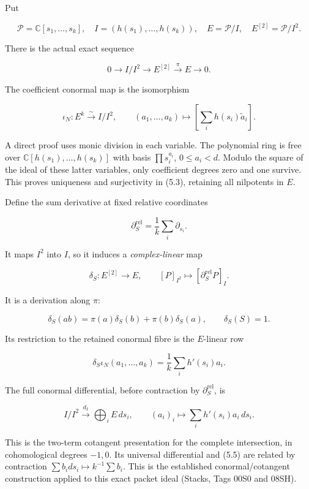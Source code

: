 \documentclass[
]{article}
\begin{document}
Put

\[\mathcal P=\mathbb C[s_1,\ldots,s_k],\quad I=(h(s_1),\ldots,h(s_k)),\quad E=\mathcal P/I,\quad E^{[2]}=\mathcal P/I^2.\]

There is the actual exact sequence

\[\boxed{0\longrightarrow I/I^2\longrightarrow E^{[2]}\xrightarrow{\pi}E\longrightarrow0.}\tag{5.2}\]

The coefficient conormal map is the isomorphism

\[\boxed{\iota_N:E^k\xrightarrow{\sim}I/I^2,\qquad (a_1,\ldots,a_k)\mapsto[\sum_i h(s_i)\widetilde a_i].}\tag{5.3}\]

A direct proof uses monic division in each variable. The polynomial ring
is free over \(\mathbb C[h(s_1),\ldots,h(s_k)]\) with basis
\(\prod s_i^{a_i}\), \(0\le a_i<d\). Modulo the square of the ideal of
these latter variables, only coefficient degrees zero and one survive.
This proves uniqueness and surjectivity in (5.3), retaining all
nilpotents in \(E\).

Define the sum derivative at fixed relative coordinates

\[\partial_S^\mathrm{rel}=\frac1k\sum_i\partial_{s_i}.\tag{5.4}\]

It maps \(I^2\) into \(I\), so it induces a \emph{complex-linear} map

\[\boxed{\delta_S:E^{[2]}\longrightarrow E,\qquad[P]_{I^2}\mapsto[\partial_S^\mathrm{rel}P]_I.}\tag{5.5}\]

It is a derivation along \(\pi\):

\[\delta_S(ab)=\pi(a)\delta_S(b)+\pi(b)\delta_S(a),\qquad\delta_S(S)=1.\]

Its restriction to the retained conormal fibre is the \(E\)-linear row

\[\boxed{\delta_S\iota_N(a_1,\ldots,a_k)=\frac1k\sum_i h'(s_i)a_i.}\tag{5.6}\]

The full conormal differential, before contraction by
\(\partial_S^{\mathrm{rel}}\), is

\[I/I^2\xrightarrow{d_I}\bigoplus_iE\,ds_i,\qquad
(a_i)_i\mapsto\sum_i h'(s_i)a_i\,ds_i.\tag{5.7}\]

This is the two-term cotangent presentation for the complete
intersection, in cohomological degrees \(-1,0\). Its universal
differential and (5.5) are related by contraction
\(\sum b_i ds_i\mapsto k^{-1}\sum b_i\). This is the established
conormal/cotangent construction applied to this exact packet ideal
(Stacks, Tags 00S0 and 08SH).
\end{document}
